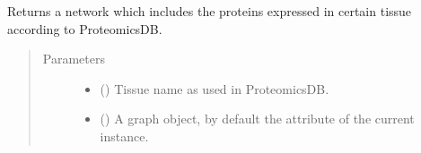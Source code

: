 \documentclass[letterpaper,10pt,english]{sphinxmanual}
\begin{document}
\begin{fulllineitems}
\begin{fulllineitems}
\end{fulllineitems}


\begin{fulllineitems}
\label{\detokenize{main:pypath.main.PyPath.tissue_network}}
Returns a network which includes the proteins expressed in
certain tissue according to ProteomicsDB.
\begin{quote}\begin{description}
\item[{Parameters}] \leavevmode\begin{itemize}
\item {} 
 () \textendash{} Tissue name as used in ProteomicsDB.

\item {} 
 () \textendash{} A graph object, by default the  attribute of
the current instance.

\end{itemize}

\end{description}\end{quote}

\end{fulllineitems}


\begin{fulllineitems}
\label{\detokenize{main:pypath.main.PyPath.transcription_factors}}
\end{fulllineitems}


\begin{fulllineitems}
\label{\detokenize{main:pypath.main.PyPath.translate_refsdir}}
\end{fulllineitems}



\end{fulllineitems}
\end{document}
